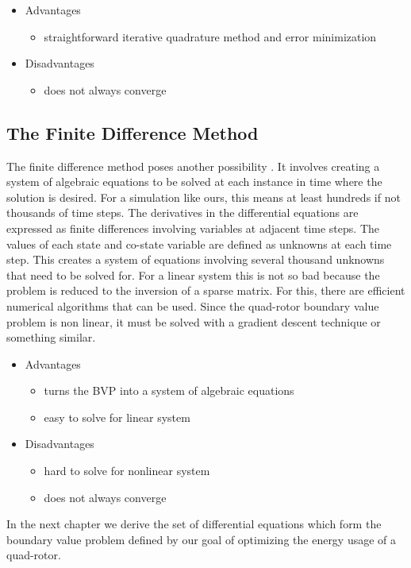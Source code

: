 \begin{itemize}
\item Advantages
    \begin{itemize} 
        \item straightforward iterative quadrature method and error minimization
    \end{itemize}
\item Disadvantages
    \begin{itemize} 
        \item does not always converge 
    \end{itemize}
\end{itemize}




\subsection{The Finite Difference Method}

The finite difference method poses another possibility \cite{rao2001applied}. It involves creating a system of algebraic equations to be solved at each instance in time where the solution is desired. For a simulation like ours, this means at least hundreds if not thousands of time steps. The derivatives in the differential equations are expressed as finite differences involving variables at adjacent time steps. The values of each state and co-state variable are defined as unknowns at each time step. This creates a system of equations involving several thousand unknowns that need to be solved for. For a linear system this is not so bad because the problem is reduced to the inversion of a sparse matrix. For this, there are efficient numerical algorithms that can be used. Since the quad-rotor boundary value problem is non linear, it must be solved with a gradient descent technique or something similar.

\begin{itemize}
\item Advantages
    \begin{itemize} 
        \item turns the BVP into a system of algebraic equations
        \item easy to solve for linear system
    \end{itemize}
\item Disadvantages
    \begin{itemize} 
        \item hard to solve for nonlinear system
        \item does not always converge 
    \end{itemize}
\end{itemize}

In the next chapter we derive the set of differential equations which form the boundary value problem defined by our goal of optimizing the energy usage of a quad-rotor.  

    


